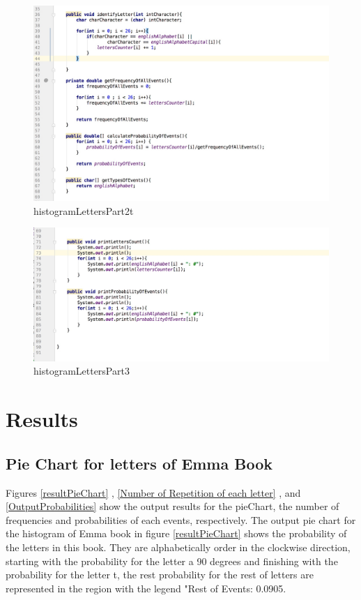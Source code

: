 \documentclass[a4paper,12pt]{article}
\begin{document}
\begin{figure}[H]
   \centering
   \includegraphics[width = 19cm]{histogramLettersPart2} %
   \caption{histogramLettersPart2t}
   \label{histogramLettersPart2}
\end{figure}

\begin{figure}[H]
   \centering
   \includegraphics[width = 19cm]{histogramLettersPart3} %
   \caption{histogramLettersPart3}
   \label{histogramLettersPart3}
\end{figure}

\section{Results}



\subsection{Pie Chart for letters of Emma Book}

Figures \ref{resultPieChart} , \ref{Number of Repetition of each letter} , and \ref{OutputProbabilities} show the output results for the pieChart, the number of frequencies and probabilities of each events, respectively. The output pie chart for the histogram of Emma book in figure \ref{resultPieChart} shows the probability of the letters in this book. They are alphabetically order in the clockwise direction, starting with the probability for the letter a 90 degrees and finishing with the probability for the letter t, the rest probability for the rest of letters are represented in the region with the legend "Rest of Events: 0.0905. 
\end{document}
